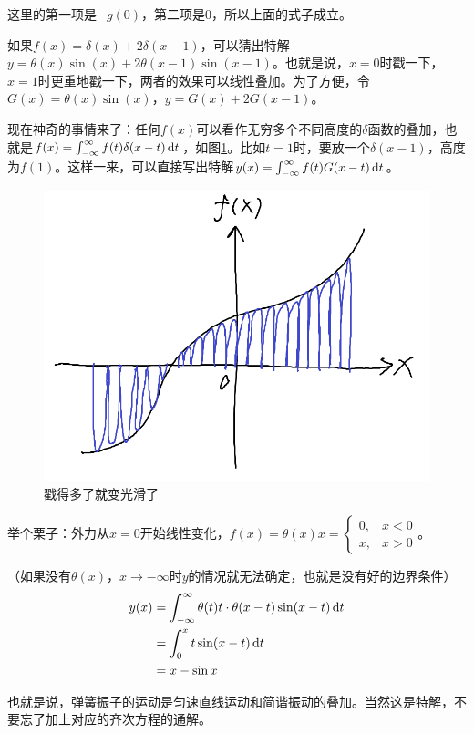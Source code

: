 这里的第一项是$-g(0)$，第二项是$0$，所以上面的式子成立。

如果$f(x)=\delta(x)+2 \delta(x-1)$，可以猜出特解$y=\theta(x) \sin(x)+2 \theta(x-1) \sin(x-1)$。也就是说，$x=0$时戳一下，$x=1$时更重地戳一下，两者的效果可以线性叠加。为了方便，令$G(x)=\theta(x) \sin(x)$，$y=G(x)+2 G(x-1)$。

现在神奇的事情来了：任何$f(x)$可以看作无穷多个不同高度的$\delta$函数的叠加，也就是$f(x)=\int_{-\infty}^{\infty} f(t) \delta(x-t) \mathop{}\!\mathrm{d} t$，如图\ref{fig-many-delta}。比如$t=1$时，要放一个$\delta(x-1)$，高度为$f(1)$。这样一来，可以直接写出特解$y(x)=\int_{-\infty}^{\infty} f(t) G(x-t) \mathop{}\!\mathrm{d} t$。
\begin{figure}[htb]
\centering
\includegraphics[scale=0.5]{fig/many-delta.png}
\caption{戳得多了就变光滑了}
\label{fig-many-delta}
\end{figure}

举个栗子：外力从$x=0$开始线性变化，$f(x)=\theta(x) x=\begin{cases} 0, &x<0 \\ x, &x>0 \end{cases}$。

（如果没有$\theta(x)$，$x \rightarrow -\infty$时$y$的情况就无法确定，也就是没有好的边界条件）
\begin{align*}
y(x)&=\int_{-\infty}^{\infty} \theta(t) t \cdot \theta(x-t) \sin(x-t) \mathop{}\!\mathrm{d} t \\
&=\int_{0}^{x} t \sin(x-t) \mathop{}\!\mathrm{d} t \\
&=x-\sin x
\end{align*}

也就是说，弹簧振子的运动是匀速直线运动和简谐振动的叠加。当然这是特解，不要忘了加上对应的齐次方程的通解。

